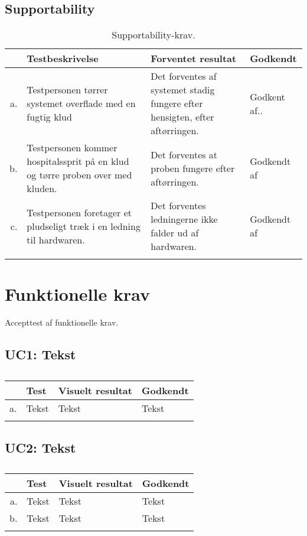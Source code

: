 \subsection{Supportability}

\begin{longtabu} to 
    &    Testbeskrivelse &    Forventet resultat &    Godkendt\\[-1ex]
    \midrule
    a. &    Testpersonen tørrer systemet overflade med en fugtig klud &  Det forventes af systemet stadig fungere efter hensigten, efter aftørringen. &   Godkent af..\\
    
    b. &  Testpersonen kommer hospitalssprit på en klud og tørre proben over med kluden.  &   Det forventes at proben fungere efter aftørringen.   &    Godkendt af\\
    
    c. & Testpersonen foretager et pludseligt træk i en ledning til hardwaren.  &   Det forventes ledningerne ikke falder ud af hardwaren.  &    Godkendt af\\
    
\caption{Supportability-krav.}
\label{AT_s1}
\end{longtabu}


\section{Funktionelle krav}
Accepttest af funktionelle krav.

\subsection{UC1: Tekst}
\begin{longtabu} to 
    &    Test &    Visuelt resultat &    Godkendt\\[-1ex]
    \midrule
    a. &    Tekst &   Tekst &    Tekst\\
\caption{}
\label{AT_UC1}
\end{longtabu}

\subsection{UC2: Tekst}
\begin{longtabu} to 
    &    Test &    Visuelt resultat &    Godkendt\\[-1ex]
    \midrule
    a. &   Tekst &   Tekst &    Tekst\\
    b. &    Tekst &    Tekst &   Tekst\\
\caption{}
\label{AT_UC2}
\end{longtabu}
